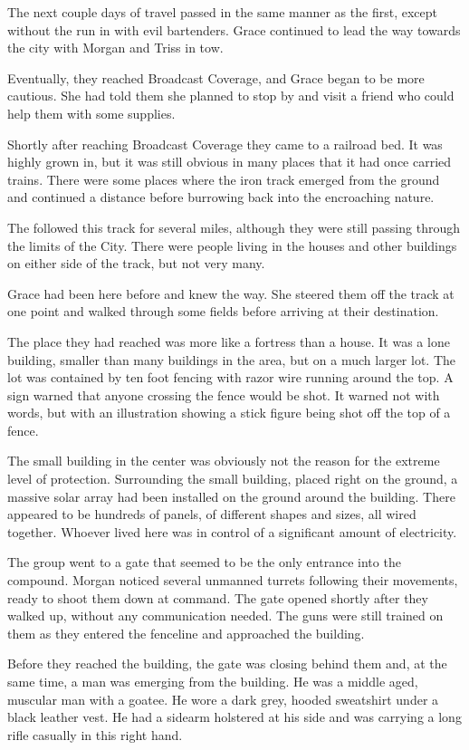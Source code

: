 \documentclass[courier]{sffms}
\begin{document}
The next couple days of travel passed in the same
manner as the first, except without the run in with
evil bartenders. Grace continued to lead the way
towards the city with Morgan and Triss in tow.

Eventually, they reached Broadcast Coverage, and
Grace began to be more cautious. She had told them
she planned to stop by and visit a friend who could
help them with some supplies.

Shortly after reaching Broadcast Coverage they came to
a railroad bed. It was highly grown in, but it was still
obvious in many places that it had once carried trains.
There were some places where the iron track emerged
from the ground and continued a distance before
burrowing back into the encroaching nature.

The followed this track for several miles, although
they were still passing through the limits of the City.
There were people living in the houses and other
buildings on either side of the track, but not very
many.

Grace had been here before and knew the way. She
steered them off the track at one point and walked
through some fields before arriving at their destination.

The place they had reached was more like a fortress
than a house. It was a lone building, smaller than
many buildings in the area, but on a much larger lot.
The lot was contained by ten foot fencing with razor
wire running around the top. A sign warned that
anyone crossing the fence would be shot. It warned
not with words, but with an illustration showing a
stick figure being shot off the top of a fence.

The small building in the center was obviously not
the reason for the extreme level of protection. Surrounding
the small building, placed right on the ground, a
massive solar array had been installed on the ground
around the building. There appeared to be hundreds
of panels, of different shapes and sizes, all wired
together. Whoever lived here was in control of a
significant amount of electricity.

The group went to a gate that seemed to be the only
entrance into the compound. Morgan noticed several
unmanned turrets following their movements, ready
to shoot them down at command. The gate opened
shortly after they walked up, without any
communication needed. The guns were still trained
on them as they entered the fenceline and approached
the building.

Before they reached the building, the gate was closing
behind them and, at the same time, a man was
emerging from the building. He was a middle aged,
muscular man with a goatee. He wore a dark grey,
hooded sweatshirt under a black leather vest. He had
a sidearm holstered at his side and was carrying a
long rifle casually in this right hand.
\end{document}

